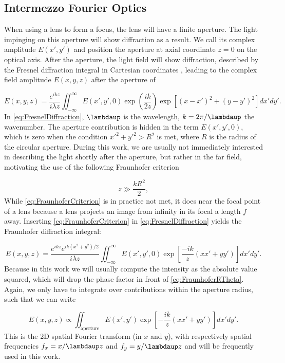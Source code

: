 \begin{mdframed}
    \subsection*{Intermezzo Fourier Optics}
    
    When using a lens to form a focus, the lens will have a finite aperture.
    The light impinging on this aperture will show diffraction as a result.
    We call its complex amplitude $E(x',y')$ and position the aperture at axial coordinate $z = 0$ on the optical axis.
    After the aperture, the light field will show diffraction, described by the Fresnel diffraction integral in Cartesian coordinates \cite{Goodman2005}, leading to the complex field amplitude $E(x,y,z)$ after the aperture of 

    \begin{equation}\label{eq:FresnelDiffraction}
        E(x,y,z) = 
        \frac{e^{ikz}}{i \lambda z} \iint_{-\infty}^{\infty} E(x',y',0) \exp{\left(\frac{ik}{2z}\right)} \exp{\left[(x-x')^2+(y-y')^2\right]} dx'dy'.
    \end{equation}
    In \cref{eq:FresnelDiffraction}, $\lambdaup$ is the wavelength, $k=2\pi/\lambdaup$ the wavenumber. The aperture contribution is hidden in the term $E(x',y',0)$, which is zero when the condition $x'^2+y'^2>R^2$ is met, where $R$ is the radius of the circular aperture.
    During this work, we are usually not immediately interested in describing the light shortly after the aperture, but rather in the far field, motivating the use of the following Fraunhofer criterion
    
    \begin{equation}\label{eq:FraunhoferCriterion}
        z \gg \frac{k R^2}{2},
    \end{equation}
    While \cref{eq:FraunhoferCriterion} is in practice not met, it does near the focal point of a lens because a lens projects an image from infinity in its focal a length $f$ away. 
    Inserting \cref{eq:FraunhoferCriterion} in \cref{eq:FresnelDiffraction} yields the Fraunhofer diffraction integral:
    
    \begin{equation}\label{eq:FraunhoferDiffraction}
        E(x, y, z)=\frac{e^{i k z} e^{i k\left(x^{2}+y^{2}\right)/2}}{i \lambda z} \iint_{-\infty}^{\infty} E(x', y',0) \exp \left[\frac{-ik}{z}(x x'+y y')\right] dx' dy'.
    \end{equation}
    Because in this work we will usually compute the intensity as the absolute value squared, which will drop the phase factor in front of \cref{eq:FraunhoferRTheta}. Again, we only have to integrate over contributions within the aperture radius, such that we can write 
    
    \begin{equation}\label{eq:FraunhoferSimplified}
        E(x,y,z) \propto 
        \iint_{\text{aperture}} E(x',y') \exp{\left[- \frac{ik}{z}(xx'+yy')\right]}dx'dy'.
    \end{equation}
    This is the 2D spatial Fourier transform (in $x$ and $y$), with respectively spatial frequencies $f_x = x/\lambdaup z$ and $f_y = y/\lambdaup z$ and will be frequently used in this work.
\end{mdframed}
